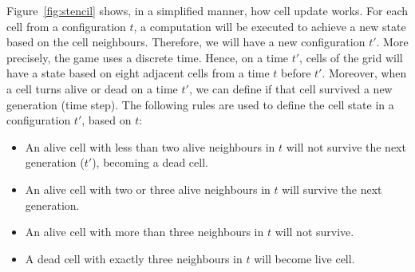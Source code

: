\documentclass[12pt]{article}
\begin{document}
Figure~\ref{fig:stencil} shows, in a simplified manner, how cell update works. For each cell from a configuration $t$, a computation will be executed to achieve a new state based on the cell neighbours. Therefore, we will have a new configuration $t'$. More precisely, the game uses a discrete time. Hence, on a time $t'$, cells of the grid will have a state based on eight adjacent cells from a time $t$ before $t'$. Moreover, when a cell turns alive or dead on a time $t'$, we can define if that cell survived a new generation (time step). The following rules are used to define the cell state in a configuration $t'$, based on $t$:

\begin{itemize}
    \item An alive cell with less than two alive neighbours in $t$ will not survive the next generation ($t'$), becoming a dead cell.
    \item An alive cell with two or three alive neighbours in $t$ will survive the next generation.
    \item An alive cell with more than three neighbours in $t$ will not survive.
    \item A dead cell with exactly three neighbours in $t$ will become live cell.
\end{itemize}


\end{document}
